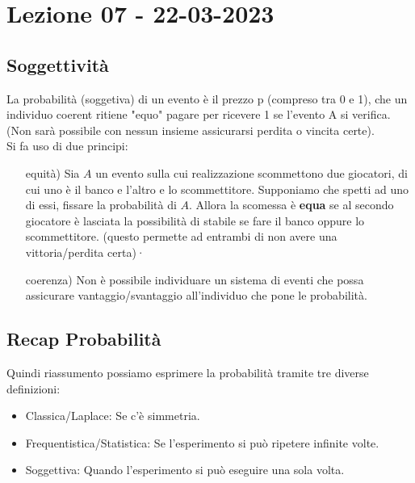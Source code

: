 \section{Lezione 07 - 22-03-2023}

\subsection{Soggettività}
La probabilità (soggetiva) di un evento è il prezzo p (compreso tra 0 e 1), che un individuo coerent ritiene "equo" pagare per ricevere 1 se l'evento A si verifica.\\
(Non sarà possibile con nessun insieme assicurarsi perdita o vincita certe).\\
Si fa uso di due principi:
\begin{itemize}
\item[equità)] Sia $A$ un evento sulla cui realizzazione scommettono due giocatori, di cui uno è il banco e l'altro e lo scommettitore. Supponiamo che spetti ad uno di essi, fissare la probabilità di $A$. Allora la scomessa è \textbf{equa} se al secondo giocatore è lasciata la possibilità di stabile se fare il banco oppure lo scommettitore.
(questo permette ad entrambi di non avere una vittoria/perdita certa)·
\item[coerenza)] Non è possibile individuare un sistema di
eventi che possa assicurare vantaggio/svantaggio all’individuo che pone
le probabilità.
\end{itemize}

\subsection{Recap Probabilità}
Quindi riassumento possiamo esprimere la probabilità tramite tre diverse definizioni:
\begin{itemize}
\item Classica/Laplace: Se c'è simmetria.
\item Frequentistica/Statistica: Se l'esperimento si può ripetere infinite volte.
\item Soggettiva: Quando l'esperimento si può eseguire una sola volta.
\end{itemize}

